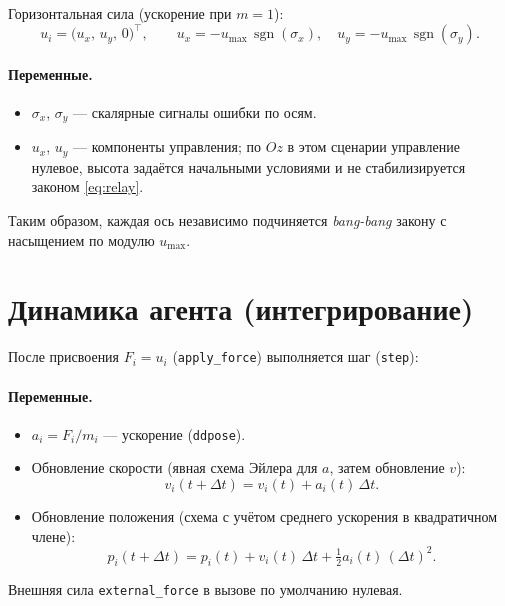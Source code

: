 \documentclass[12pt,a4paper]{article}
\begin{document}
Горизонтальная сила (ускорение при $m=1$):
\begin{equation}
  u_i = \bigl(u_x,\, u_y,\, 0\bigr)^\top,\qquad
  u_x = -u_{\max}\,\operatorname{sgn}(\sigma_x),\quad
  u_y = -u_{\max}\,\operatorname{sgn}(\sigma_y).
\label{eq:relay}
\end{equation}

\paragraph{Переменные.}
\begin{itemize}
  \item $\sigma_x$, $\sigma_y$ --- скалярные сигналы ошибки по осям.
  \item $u_x$, $u_y$ --- компоненты управления; по $Oz$ в этом сценарии управление нулевое, высота задаётся начальными условиями и не стабилизируется законом \eqref{eq:relay}.
\end{itemize}

Таким образом, каждая ось независимо подчиняется \emph{bang-bang} закону с насыщением по модулю $u_{\max}$.

\section{Динамика агента (интегрирование)}
\label{sec:dynamics}

После присвоения $F_i = u_i$ (\texttt{apply\_force}) выполняется шаг (\texttt{step}):

\paragraph{Переменные.}
\begin{itemize}
  \item $a_i = F_i / m_i$ --- ускорение (\texttt{ddpose}).
  \item Обновление скорости (явная схема Эйлера для $a$, затем обновление $v$):
  \begin{equation}
    v_i(t+\Delta t) = v_i(t) + a_i(t)\,\Delta t.
  \end{equation}
  \item Обновление положения (схема с учётом среднего ускорения в квадратичном члене):
  \begin{equation}
    p_i(t+\Delta t) = p_i(t) + v_i(t)\,\Delta t + \tfrac{1}{2} a_i(t)\,(\Delta t)^2.
  \end{equation}
\end{itemize}
Внешняя сила \texttt{external\_force} в вызове по умолчанию нулевая.
\end{document}
